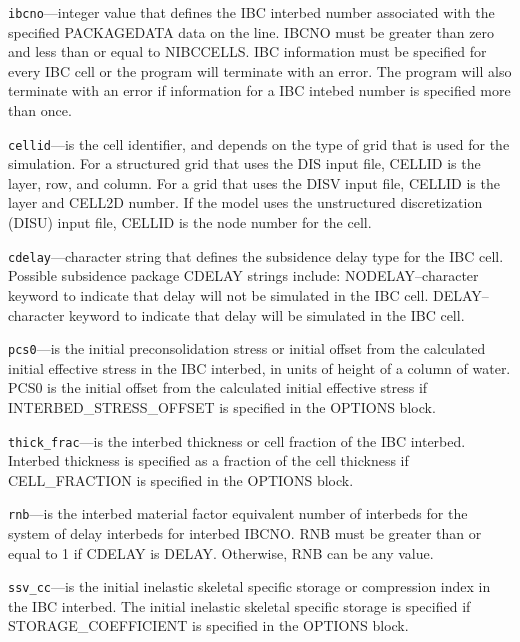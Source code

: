 \begin{description}
\item \texttt{ibcno}---integer value that defines the IBC interbed number associated with the specified PACKAGEDATA data on the line. IBCNO must be greater than zero and less than or equal to NIBCCELLS.  IBC information must be specified for every IBC cell or the program will terminate with an error.  The program will also terminate with an error if information for a IBC intebed number is specified more than once.

\item \texttt{cellid}---is the cell identifier, and depends on the type of grid that is used for the simulation.  For a structured grid that uses the DIS input file, CELLID is the layer, row, and column.   For a grid that uses the DISV input file, CELLID is the layer and CELL2D number.  If the model uses the unstructured discretization (DISU) input file, CELLID is the node number for the cell.

\item \texttt{cdelay}---character string that defines the subsidence delay type for the IBC cell. Possible subsidence package CDELAY strings include: NODELAY--character keyword to indicate that delay will not be simulated in the IBC cell.  DELAY--character keyword to indicate that delay will be simulated in the IBC cell.

\item \texttt{pcs0}---is the initial preconsolidation stress or initial offset from the calculated initial effective stress in the IBC interbed, in units of height of a column of water. PCS0 is the initial offset from the calculated initial effective stress if INTERBED\_STRESS\_OFFSET is specified in the OPTIONS block.

\item \texttt{thick\_frac}---is the interbed thickness or cell fraction of the IBC interbed. Interbed thickness is specified as a fraction of the cell thickness if CELL\_FRACTION is specified in the OPTIONS block.

\item \texttt{rnb}---is the interbed material factor equivalent number of interbeds for the system of delay interbeds for interbed IBCNO. RNB must be greater than or equal to 1 if CDELAY is DELAY. Otherwise, RNB can be any value.

\item \texttt{ssv\_cc}---is the initial inelastic skeletal specific storage or compression index in the IBC interbed. The initial inelastic skeletal specific storage is specified if STORAGE\_COEFFICIENT is specified in the OPTIONS block.


\end{description}
